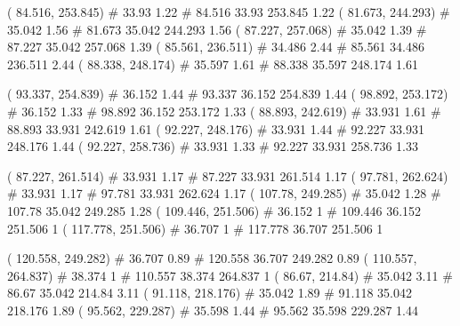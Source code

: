 \documentclass[a4paper,openbib,10pt]{article}
\newenvironment{treegraph}{\begin{graph}}{\end{graph}}
\begin{document}
\begin{treegraph}
  ( 84.516, 253.845) #     33.93    1.22
   #    84.516    33.93    253.845    1.22
  ( 81.673, 244.293) #     35.042    1.56
   #    81.673    35.042    244.293    1.56
  ( 87.227, 257.068) #     35.042    1.39
   #    87.227    35.042    257.068    1.39
  ( 85.561, 236.511) #     34.486    2.44
   #    85.561    34.486    236.511    2.44
  ( 88.338, 248.174) #     35.597    1.61
   #    88.338    35.597    248.174    1.61

  ( 93.337, 254.839) #     36.152    1.44
   #    93.337    36.152    254.839    1.44
  ( 98.892, 253.172) #     36.152    1.33
   #    98.892    36.152    253.172    1.33
  ( 88.893, 242.619) #     33.931    1.61
   #    88.893    33.931    242.619    1.61
  ( 92.227, 248.176) #     33.931    1.44
   #    92.227    33.931    248.176    1.44
  ( 92.227, 258.736) #     33.931    1.33
   #    92.227    33.931    258.736    1.33

  ( 87.227, 261.514) #     33.931    1.17
   #    87.227    33.931    261.514    1.17
  ( 97.781, 262.624) #     33.931    1.17
   #    97.781    33.931    262.624    1.17
  ( 107.78, 249.285) #     35.042    1.28
   #    107.78    35.042    249.285    1.28
  ( 109.446, 251.506) #     36.152    1
   #    109.446    36.152    251.506    1
  ( 117.778, 251.506) #     36.707    1
   #    117.778    36.707    251.506    1

  ( 120.558, 249.282) #     36.707    0.89
   #    120.558    36.707    249.282    0.89
  ( 110.557, 264.837) #     38.374    1
   #    110.557    38.374    264.837    1
  ( 86.67, 214.84) #     35.042    3.11
   #    86.67    35.042    214.84    3.11
  ( 91.118, 218.176) #     35.042    1.89
   #    91.118    35.042    218.176    1.89
  ( 95.562, 229.287) #     35.598    1.44
   #    95.562    35.598    229.287    1.44


\end{treegraph}
\end{document}
